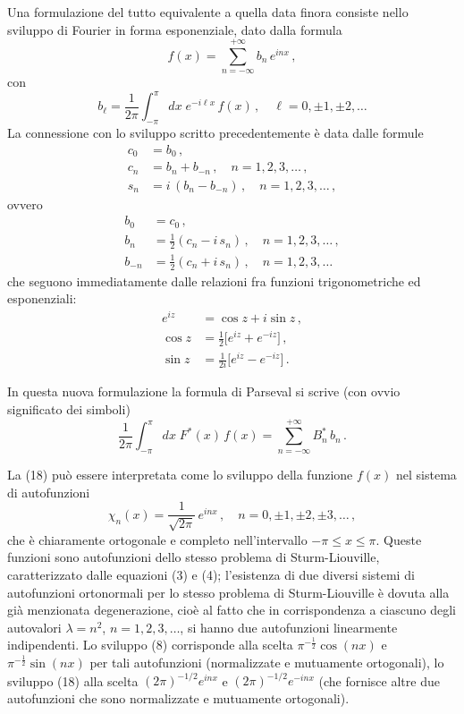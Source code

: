 \documentclass[11pt, a4paper]{book}
\numberwithin{equation}{section}
\begin{document}
Una formulazione del tutto equivalente a quella data finora consiste nello sviluppo di Fourier in forma esponenziale, dato dalla formula
\begin{equation}
  f(x) = \sum_{n=-\infty}^{+\infty} b_n\,e^{inx}\,, \tag{18}
\end{equation}
con
\begin{equation}
  b_\ell = \frac{1}{2\pi}\int_{-\pi}^{\pi} dx\;e^{-i\ell x}\,f(x)\,,
  \quad \ell=0,\pm1,\pm2,\ldots \tag{19}
\end{equation}
La connessione con lo sviluppo scritto precedentemente è data dalle formule
\begin{align}
  c_0 &= b_0\,, \tag{20a}\\
  c_n &= b_n + b_{-n}\,,\quad n=1,2,3,\ldots\,, \tag{20b}\\
  s_n &= i\,(b_n - b_{-n})\,,\quad n=1,2,3,\ldots\,, \tag{20c}
\end{align}
ovvero
\begin{align}
  b_0 &= c_0\,, \tag{21a}\\
  b_n &= \tfrac{1}{2}(c_n - i\,s_n)\,,\quad n=1,2,3,\ldots\,, \tag{21b}\\
  b_{-n} &= \tfrac{1}{2}(c_n + i\,s_n)\,,\quad n=1,2,3,\ldots \tag{21c}
\end{align}
che seguono immediatamente dalle relazioni fra funzioni trigonometriche ed esponenziali:
\begin{align}
  e^{iz} &= \cos z + i\sin z\,, \tag{22}\\
  \cos z &= \tfrac{1}{2}\bigl[e^{iz}+e^{-iz}\bigr]\,, \tag{23a}\\
  \sin z &= \frac{1}{2i}\bigl[e^{iz}-e^{-iz}\bigr]\,. \tag{23b}
\end{align}

In questa nuova formulazione la formula di Parseval si scrive (con ovvio significato dei simboli)
\begin{equation}
  \frac{1}{2\pi}\int_{-\pi}^{\pi} dx\;F^*(x)\,f(x)
  = \sum_{n=-\infty}^{+\infty} B_n^*\,b_n\,. \tag{24}
\end{equation}

La (18) può essere interpretata come lo sviluppo della funzione $f(x)$ nel sistema di autofunzioni
\begin{equation}
  \chi_n(x) = \frac{1}{\sqrt{2\pi}}\,e^{inx}\,,\quad n=0,\pm1,\pm2,\pm3,\ldots\,, \tag{25}
\end{equation}
che è chiaramente ortogonale e completo nell'intervallo $-\pi \leq x \leq \pi$. Queste funzioni sono autofunzioni dello stesso problema di Sturm-Liouville, caratterizzato dalle equazioni (3) e (4); l'esistenza di due diversi sistemi di autofunzioni ortonormali per lo stesso problema di Sturm-Liouville è dovuta alla già menzionata degenerazione, cioè al fatto che in corrispondenza a ciascuno degli autovalori $\lambda=n^2$, $n=1,2,3,\ldots$, si hanno due autofunzioni linearmente indipendenti. Lo sviluppo (8) corrisponde alla scelta $\pi^{-\frac{1}{2}}\cos(nx)$ e $\pi^{-\frac{1}{2}}\sin(nx)$ per tali autofunzioni (normalizzate e mutuamente ortogonali), lo sviluppo (18) alla scelta $(2\pi)^{-1/2}e^{inx}$ e $(2\pi)^{-1/2}e^{-inx}$ (che fornisce altre due autofunzioni che sono normalizzate e mutuamente ortogonali).
\end{document}
